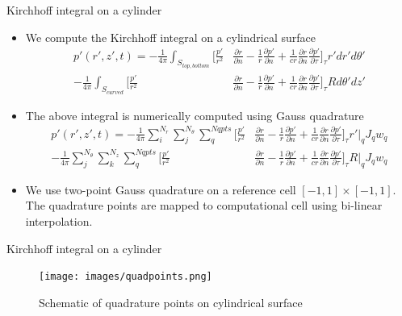 \documentclass[10pt, aspectratio=169]{beamer}
\begin{document}
\begin{frame}{Kirchhoff integral on a cylinder}
	\begin{itemize}
		\item We compute the Kirchhoff integral on a cylindrical surface 
		\begin{equation}
			\begin{split}
				p'(r', z', t) =  -\frac{1}{4\pi}\int_{S_{top, bottom}}\Big[  \frac{p'}{r^{2}}&\frac{\partial r}{\partial n} - \frac{1}{r}\frac{\partial p'}{\partial n} + \frac{1}{c r}\frac{\partial r}{\partial n}\frac{\partial p'}{\partial \tau} \Big]_{\tau} r'dr'd\theta' \\
								 -\frac{1}{4\pi}\int_{S_{curved}} \Big[  \frac{p'}{r^{2}}&\frac{\partial r}{\partial n} - \frac{1}{r}\frac{\partial p'}{\partial n} + \frac{1}{c r}\frac{\partial r}{\partial n}\frac{\partial p'}{\partial \tau} \Big]_{\tau} Rd\theta'dz'  
			\end{split} 
		\end{equation}
		\item The above integral is numerically computed using Gauss quadrature
		\begin{equation}
			\begin{split}
				p'(r', z', t) =  -\frac{1}{4\pi}\sum_{i}^{N_r}\sum_{j}^{N_\theta}\sum_q^{Nqpts} \Big[  \frac{p'}{r^{2}}&\frac{\partial r}{\partial n} - \frac{1}{r}\frac{\partial p'}{\partial n} + \frac{1}{c r}\frac{\partial r}{\partial n}\frac{\partial p'}{\partial \tau} \Big]_{\tau} r'\Big |_q J_q w_q\\
								 -\frac{1}{4\pi}\sum_{j}^{N_\theta}\sum_{k}^{N_z}\sum_q^{Nqpts} \Big[  \frac{p'}{r^{2}}&\frac{\partial r}{\partial n} - \frac{1}{r}\frac{\partial p'}{\partial n} + \frac{1}{c r}\frac{\partial r}{\partial n}\frac{\partial p'}{\partial \tau} \Big]_{\tau} R \Big |_q J_q w_q 
			\end{split} 
		\end{equation}
		\item We use two-point Gauss quadrature on a reference cell $[-1, 1]\times [-1, 1]$. The quadrature points are mapped to computational cell using bi-linear interpolation. 
	\end{itemize}
\end{frame}

\begin{frame}{Kirchhoff integral on a cylinder}

	\begin{figure}
		\centering
		\texttt{[image: images/quadpoints.png]}
		\caption{Schematic of quadrature points on cylindrical surface}
	\end{figure}
\end{frame}
\end{document}
